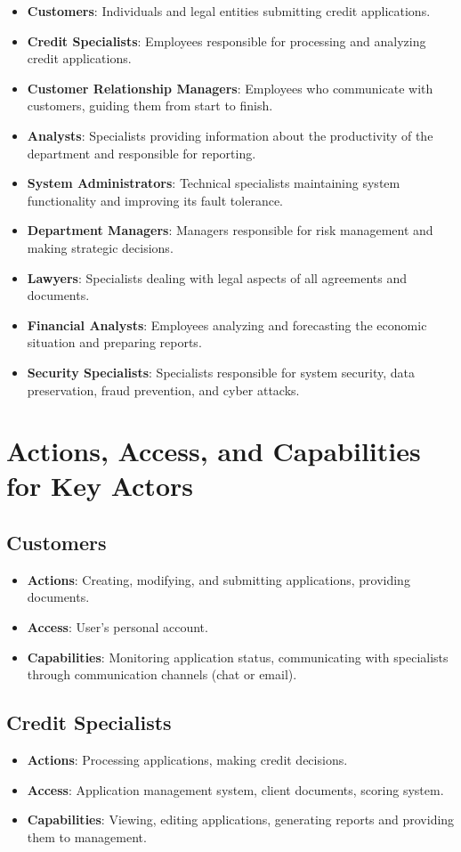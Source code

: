 \documentclass[20pt]{article}
\begin{document}
\begin{itemize}
    \item \textbf{Customers}: Individuals and legal entities submitting credit applications.
    \item \textbf{Credit Specialists}: Employees responsible for processing and analyzing credit applications.
    \item \textbf{Customer Relationship Managers}: Employees who communicate with customers, guiding them from start to finish.
    \item \textbf{Analysts}: Specialists providing information about the productivity of the department and responsible for reporting.
    \item \textbf{System Administrators}: Technical specialists maintaining system functionality and improving its fault tolerance.
    \item \textbf{Department Managers}: Managers responsible for risk management and making strategic decisions.
    \item \textbf{Lawyers}: Specialists dealing with legal aspects of all agreements and documents.
    \item \textbf{Financial Analysts}: Employees analyzing and forecasting the economic situation and preparing reports.
    \item \textbf{Security Specialists}: Specialists responsible for system security, data preservation, fraud prevention, and cyber attacks.
\end{itemize}

\section{Actions, Access, and Capabilities for Key Actors}

\subsection{Customers}
\begin{itemize}
    \item \textbf{Actions}: Creating, modifying, and submitting applications, providing documents.
    \item \textbf{Access}: User's personal account.
    \item \textbf{Capabilities}: Monitoring application status, communicating with specialists through communication channels (chat or email).
\end{itemize}

\subsection{Credit Specialists}
\begin{itemize}
    \item \textbf{Actions}: Processing applications, making credit decisions.
    \item \textbf{Access}: Application management system, client documents, scoring system.
    \item \textbf{Capabilities}: Viewing, editing applications, generating reports and providing them to management.
\end{itemize}
\end{document}
